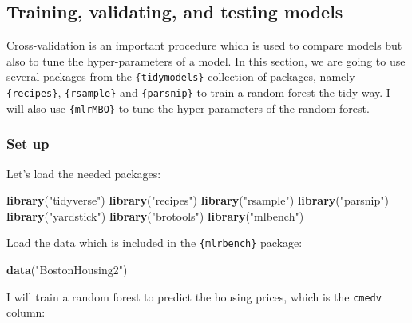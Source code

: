 \documentclass[
]{article}
\newenvironment{Shaded}{\begin{snugshade}}{\end{snugshade}}
\newcommand{\KeywordTok}[1]{\textcolor[rgb]{0.13,0.29,0.53}{\textbf{#1}}}
\newcommand{\NormalTok}[1]{#1}
\newcommand{\StringTok}[1]{\textcolor[rgb]{0.31,0.60,0.02}{#1}}
\begin{document}
\hypertarget{training-validating-and-testing-models}{%
\subsection{Training, validating, and testing models}\label{training-validating-and-testing-models}}

Cross-validation is an important procedure which is used to compare models but also to tune the
hyper-parameters of a model. In this section, we are going to use several packages from the
\href{https://github.com/tidymodels}{\texttt{\{tidymodels\}}} collection of packages, namely
\href{https://tidymodels.github.io/recipes/}{\texttt{\{recipes\}}},
\href{https://tidymodels.github.io/rsample/}{\texttt{\{rsample\}}} and
\href{https://tidymodels.github.io/parsnip/}{\texttt{\{parsnip\}}} to train a random forest the tidy way. I will
also use \href{http://mlrmbo.mlr-org.com/}{\texttt{\{mlrMBO\}}} to tune the hyper-parameters of the random forest.

\hypertarget{set-up}{%
\subsubsection{Set up}\label{set-up}}

Let's load the needed packages:

\begin{Shaded}
\begin{Highlighting}[]
\KeywordTok{library}\NormalTok{(}\StringTok{"tidyverse"}\NormalTok{)}
\KeywordTok{library}\NormalTok{(}\StringTok{"recipes"}\NormalTok{)}
\KeywordTok{library}\NormalTok{(}\StringTok{"rsample"}\NormalTok{)}
\KeywordTok{library}\NormalTok{(}\StringTok{"parsnip"}\NormalTok{)}
\KeywordTok{library}\NormalTok{(}\StringTok{"yardstick"}\NormalTok{)}
\KeywordTok{library}\NormalTok{(}\StringTok{"brotools"}\NormalTok{)}
\KeywordTok{library}\NormalTok{(}\StringTok{"mlbench"}\NormalTok{)}
\end{Highlighting}
\end{Shaded}

Load the data which is included in the \texttt{\{mlrbench\}} package:

\begin{Shaded}
\begin{Highlighting}[]
\KeywordTok{data}\NormalTok{(}\StringTok{"BostonHousing2"}\NormalTok{)}
\end{Highlighting}
\end{Shaded}

I will train a random forest to predict the housing prices, which is the \texttt{cmedv} column:
\end{document}
